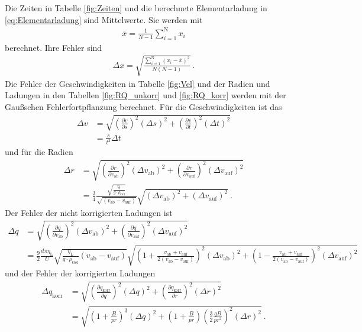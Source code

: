 Die Zeiten in Tabelle \ref{fig:Zeiten} und die berechnete Elementarladung in \eqref{eq:Elementarladung} sind Mittelwerte. Sie werden mit
\begin{align}
	\bar{x} =  \frac{1}{N-1} \sum_{i=1}^\text{N} x_i
\end{align}
berechnet. Ihre Fehler sind
\begin{align}
	\Delta x = \sqrt{\frac{\sum_{i=1}^\text{N} (x_i - \bar{x})^2}{N(N-1)}} \ .
\end{align}
Die Fehler der Geschwindigkeiten in Tabelle \ref{fig:Vel} und der Radien und Ladungen in den Tabellen \ref{fig:RQ_unkorr} und \ref{fig:RQ_korr} werden mit der Gaußschen Fehlerfortpflanzung berechnet. Für die Geschwindigkeiten ist das
\begin{align}
	\Delta v &= \sqrt{\left(\frac{\partial v}{\partial s}\right)^2(\Delta s)^2 + \left(\frac{\partial v}{\partial t}\right)^2(\Delta t)^2} \\
	&= \frac{s}{t^2}\Delta t
\end{align}
und für die Radien
\begin{align}
	\Delta r &= \sqrt{\left(\frac{\partial r}{\partial v_\text{ab}}\right)^2(\Delta v_\text{ab})^2 + \left(\frac{\partial r}{\partial v_\text{auf}}\right)^2(\Delta v_\text{auf})^2} \\
	&= \frac{3}{4}\frac{\sqrt{\frac{\eta_\text{L}}{g\cdot\rho_\text{Oel}}}}{\sqrt{(v_\text{ab}-v_\text{auf})}} \sqrt{(\Delta v_\text{ab})^2 + (\Delta v_\text{auf})^2} \ .
\end{align}
Der Fehler der nicht korrigierten Ladungen ist
\begin{align}
	\Delta q &= \sqrt{\left(\frac{\partial q}{\partial v_\text{ab}}\right)^2(\Delta v_\text{ab})^2 + \left(\frac{\partial q}{\partial v_\text{auf}}\right)^2(\Delta v_\text{auf})^2} \\
	&= \frac{9}{2}\frac{d\pi\eta_\text{L}}{U}\sqrt{\frac{\eta_\text{L}}{g\cdot\rho_\text{Oel}}(v_\text{ab}-v_\text{auf})}
	\sqrt{\left(1+\frac{v_\text{ab}+v_\text{auf}}{2(v_\text{ab}-v_\text{auf}) }\right)^2(\Delta v_\text{ab})^2
	+\left(1-\frac{v_\text{ab}+v_\text{auf}}{2(v_\text{ab}-v_\text{auf})}\right)^2(\Delta v_\text{auf})^2}
\end{align}
und der Fehler der korrigierten Ladungen
\begin{align}
	\Delta q_\text{korr} &= \sqrt{\left(\frac{\partial q_\text{korr}}{\partial q}\right)^2(\Delta q)^2 + \left(\frac{\partial q_\text{korr}}{\partial r}\right)^2(\Delta r)^2} \\
	&= \sqrt{\left(1+\frac{B}{pr}\right)^3(\Delta q)^2 + \left(1+\frac{B}{pr}\right) \left(\frac{3}{2}\frac{qB}{pr^2}\right)^2(\Delta r)^2} \ .
\end{align}
